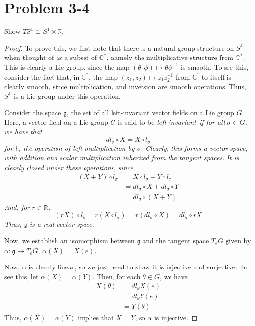 \documentclass[fontsize=11pt]{scrartcl} %
\numberwithin{equation}{section} %
\numberwithin{figure}{section} %
\numberwithin{table}{section} %
\newcommand{\R}{\mathbb{R}}
\newcommand{\C}{\mathbb{C}}
\begin{document}
\section*{Problem 3-4}
Show $TS^1 \cong S^1\times\R$.
\\
\begin{proof}
To prove this, we first note that there is a natural group structure on $S^1$ when thought
of as a subset of $\C^*$, namely the multiplicative structure from $\C^*$. This is clearly
a Lie group, since the map $(\theta,\phi)\mapsto\theta\phi^{-1}$ is smooth. To see this,
consider the fact that, in $\C^*$, the map $(z_1,z_2)\mapsto z_1z_2^{-1}$ from $\C^*$ to
itself is clearly smooth, since multiplication, and inversion are smooth operations.
Thus, $S^1$ is a Lie group under this operation.

Consider the space $\mathfrak{g}$, the set of all left-invariant vector fields on a Lie group $G$.
Here, a vector field on a Lie group $G$ is said to be \em left-invariant\em\ if for all $\sigma\in G$,
we have that 
\[
dl_{\sigma}\circ X = X\circ l_{\sigma}
\]
for $l_{\sigma}$ the operation of left-multiplication by $\sigma$.
Clearly, this forms a vector space, with addition and scalar multiplication inherited
from the tangent spaces. It is clearly closed under these operations, since
\[
\begin{aligned}
(X + Y)\circ l_{\sigma} &= X\circ l_{\sigma} + Y\circ l_{\sigma}\\
                        &= dl_{\sigma}\circ X + dl_{\sigma}\circ Y\\
                        &= dl_{\sigma}\circ(X + Y)
\end{aligned}
\]
And, for $r\in\R$,
\[
(rX)\circ l_{\sigma} = r(X\circ l_{\sigma}) = r(dl_{\sigma}\circ X) = dl_{\sigma}\circ rX
\]
Thus, $\mathfrak{g}$ is a real vector space.

Now, we establish an isomorphism between $\mathfrak{g}$ and
the tangent space $T_eG$ given by $\alpha:\mathfrak{g}\to T_eG$, $\alpha(X) = X(e)$.

Now, $\alpha$ is clearly linear, so we just need to show it is injective and surjective.
To see this, let $\alpha(X) = \alpha(Y)$. Then, for each $\theta\in G$, we have
\[
\begin{aligned}
X(\theta)   &= dl_{\theta}X(e)\\
            &= dl_{\theta}Y(e)\\
            &= Y(\theta)
\end{aligned}
\]
Thus, $\alpha(X)=\alpha(Y)$ implies that $X=Y$, so $\alpha$ is injective.


\end{proof}
\end{document}
